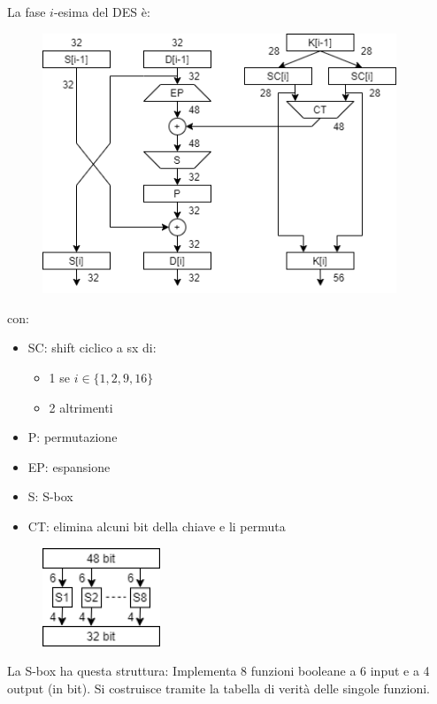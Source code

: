 La fase $i$-esima del DES è:

\begin{figure}[H]
    \centering
    \includegraphics[width = 300pt]{DES_2.png}
\end{figure}
con:
\begin{itemize}
    \item SC: shift ciclico a sx di:
    \begin{itemize}
        \item 1 se $i \in \{1, 2, 9, 16\}$
        \item 2 altrimenti
    \end{itemize}
    \item P: permutazione
    \item EP: espansione
    \item S: S-box
    \item CT: elimina alcuni bit della chiave e li permuta
\end{itemize}

\begin{figure}
    \includegraphics[width = 100pt]{DES_3.png}
\end{figure}
La S-box ha questa struttura:
Implementa 8 funzioni booleane a 6 input e a 4 output (in bit).
Si costruisce tramite la tabella di verità delle singole funzioni.

\clearpage

